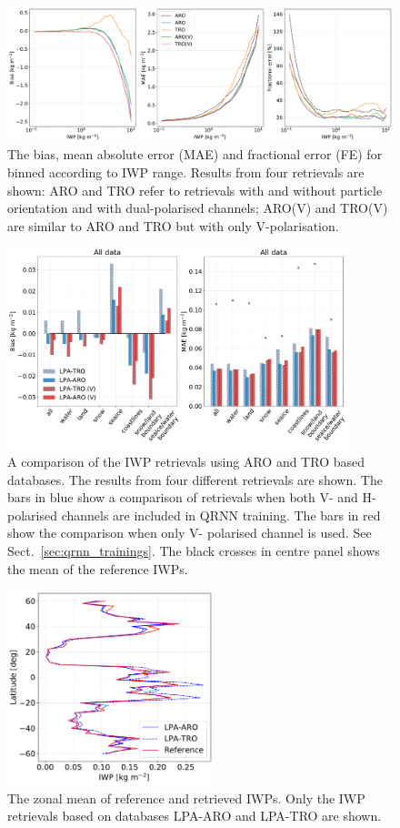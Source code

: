 \documentclass[amt, manuscript]{copernicus}
\begin{document}
\begin{figure}[t]
	\includegraphics[width=12cm]{Figures/IWP_statistics.pdf}
	\caption{The bias, mean absolute error (MAE) and fractional error (FE) for binned according to IWP range. Results from four retrievals are shown: ARO and TRO refer to retrievals with and without particle orientation and with dual-polarised channels; ARO(V) and TRO(V) are similar to ARO and TRO but with only V-polarisation. }
	\label{fig:IWP_stats}
\end{figure}



\begin{figure}[t]
	\includegraphics[width=10cm]{Figures/ARO_TRO_v_vh_all.pdf}
	\caption{A comparison of the IWP retrievals using ARO and TRO based databases. The results from four different retrievals are shown. The bars in blue show a comparison of retrievals when both V- and H- polarised channels are included in QRNN training. The bars in red show the comparison when only V- polarised channel is used. See Sect.~\ref{sec:qrnn_trainings}. The black crosses in centre panel shows the mean of the reference IWPs.  }
	\label{fig:bias_ARO_TRO}
\end{figure}

\begin{figure}[t]
	\includegraphics[width=6cm]{Figures/zonal_mean_all_jan_testdata.pdf}
	\caption{The zonal mean of reference and retrieved IWPs. Only the  IWP retrievals based on databases LPA-ARO and LPA-TRO are shown.}
	\label{fig:zonal_mean_test}
\end{figure}
\end{document}
